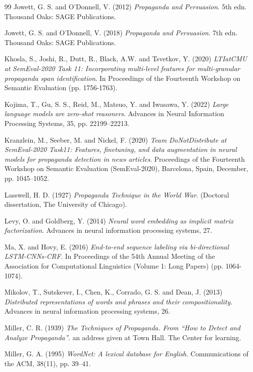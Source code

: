 \documentclass[12pt, a4paper]{article}
\begin{document}
\begin{thebibliography}{99}
 Jowett, G. S. and O'Donnell, V. (2012) \textit{Propaganda and Persuasion}. 5th edn. Thousand Oaks: SAGE Publications.

 Jowett, G. S. and O'Donnell, V. (2018) \textit{Propaganda and Persuasion}. 7th edn. Thousand Oaks: SAGE Publications.

 Khosla, S., Joshi, R., Dutt, R., Black, A.W. and Tsvetkov, Y. (2020) \textit{LTIatCMU at SemEval-2020 Task 11: Incorporating multi-level features for multi-granular propaganda span identification}. In Proceedings of the Fourteenth Workshop on Semantic Evaluation (pp. 1756-1763).

 Kojima, T., Gu, S. S., Reid, M., Matsuo, Y. and Iwasawa, Y. (2022) \textit{Large language models are zero-shot reasoners}. Advances in Neural Information Processing Systems, 35, pp. 22199–22213.

 Kranzlein, M., Seeber, M. and Nickel, F. (2020) \textit{Team DoNotDistribute at SemEval-2020 Task11: Features, finetuning, and data augmentation in neural models for propaganda detection in news articles}. Proceedings of the Fourteenth Workshop on Semantic Evaluation (SemEval-2020), Barcelona, Spain, December, pp. 1045–1052.

 Lasswell, H. D. (1927) \textit{Propaganda Technique in the World War}.  (Doctoral dissertation, The University of Chicago).

 Levy, O. and Goldberg, Y. (2014) \textit{Neural word embedding as implicit matrix factorization}. Advances in neural information processing systems, 27.

 Ma, X. and Hovy, E. (2016) \textit{End-to-end sequence labeling via bi-directional LSTM-CNNs-CRF}. In Proceedings of the 54th Annual Meeting of the Association for Computational Linguistics (Volume 1: Long Papers) (pp. 1064-1074).

 Mikolov, T., Sutskever, I., Chen, K., Corrado, G. S. and Dean, J. (2013) \textit{Distributed representations of words and phrases and their compositionality}. Advances in neural information processing systems, 26.

 Miller, C. R. (1939) \textit{The Techniques of Propaganda. From “How to Detect and Analyze Propaganda”}. an address given at Town Hall. The Center for learning.

 Miller, G. A. (1995) \textit{WordNet: A lexical database for English}. Communications of the ACM, 38(11), pp. 39–41.


\end{thebibliography}
\end{document}
